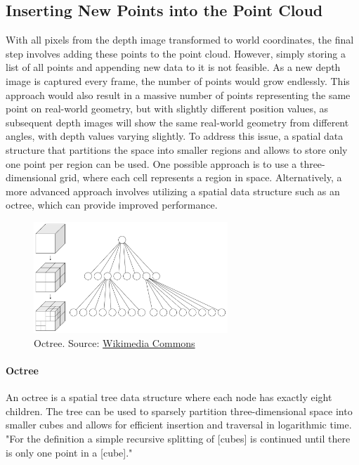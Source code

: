 \subsection{Inserting New Points into the Point Cloud}\label{subsec:inserting-new-points-into-the-point-cloud}

With all pixels from the depth image transformed to world coordinates, the final step involves adding these points to the point cloud.
However, simply storing a list of all points and appending new data to it is not feasible.
As a new depth image is captured every frame, the number of points would grow endlessly.
This approach would also result in a massive number of points representing the same point on real-world geometry,
but with slightly different position values,
as subsequent depth images will show the same real-world geometry from different angles, with depth values varying slightly.
To address this issue, a spatial data structure that partitions the space into smaller regions and
allows to store only one point per region can be used.
One possible approach is to use a three-dimensional grid, where each cell represents a region in space.
Alternatively, a more advanced approach involves utilizing a spatial data structure such as an octree,
which can provide improved performance.

\begin{figure}[h]
    \centering
    \includegraphics[width=0.65\textwidth]{images/octree}
    \caption{Octree. Source: \href{https://commons.wikimedia.org/wiki/File:Octree2.svg}{Wikimedia Commons}}
    \label{fig:octrree}
\end{figure}
\paragraph{Octree}
An octree is a spatial tree data structure where each node has exactly eight children.
The tree can be used to sparsely partition three-dimensional space into smaller cubes and allows for efficient
insertion and traversal in logarithmic time.
"For the definition a simple recursive splitting of [cubes] is continued until there is only one point in a [cube]."
\parencite{gabriel_zachmann_geometric_2002}


